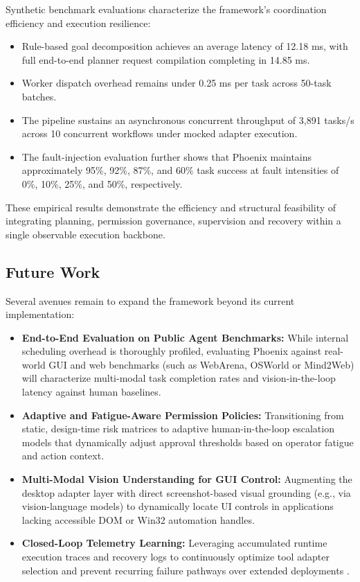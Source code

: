 \documentclass[conference]{IEEEtran}
\begin{document}
Synthetic benchmark evaluations characterize the framework's coordination efficiency and execution resilience:
\begin{itemize}
    \item Rule-based goal decomposition achieves an average latency of 12.18 ms, with full end-to-end planner request compilation completing in 14.85 ms.
    \item Worker dispatch overhead remains under 0.25 ms per task across 50-task batches.
    \item The pipeline sustains an asynchronous concurrent throughput of 3,891 tasks/s across 10 concurrent workflows under mocked adapter execution.
    \item The fault-injection evaluation further shows that Phoenix maintains approximately 95\%, 92\%, 87\%, and 60\% task success at fault intensities of 0\%, 10\%, 25\%, and 50\%, respectively.
\end{itemize}

These empirical results demonstrate the efficiency and structural feasibility of integrating planning, permission governance, supervision and recovery within a single observable execution backbone.

\subsection{Future Work}
Several avenues remain to expand the framework beyond its current implementation:
\begin{itemize}
    \item \textbf{End-to-End Evaluation on Public Agent Benchmarks:} While internal scheduling overhead is thoroughly profiled, evaluating Phoenix against real-world GUI and web benchmarks (such as WebArena, OSWorld or Mind2Web) will characterize multi-modal task completion rates and vision-in-the-loop latency against human baselines.
    \item \textbf{Adaptive and Fatigue-Aware Permission Policies:} Transitioning from static, design-time risk matrices to adaptive human-in-the-loop escalation models that dynamically adjust approval thresholds based on operator fatigue and action context.
    \item \textbf{Multi-Modal Vision Understanding for GUI Control:} Augmenting the desktop adapter layer with direct screenshot-based visual grounding (e.g., via vision-language models) to dynamically locate UI controls in applications lacking accessible DOM or Win32 automation handles.
    \item \textbf{Closed-Loop Telemetry Learning:} Leveraging accumulated runtime execution traces and recovery logs to continuously optimize tool adapter selection and prevent recurring failure pathways over extended deployments \cite{babu2026, jeong2026, patel2026isiber}.
\end{itemize}
\end{document}
